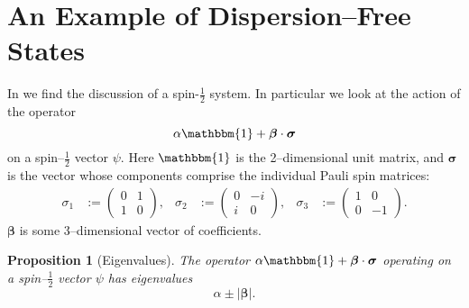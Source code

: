\documentclass[12pt]{article}
\newtheorem{prop}[thm]{Proposition}
\begin{document}
\section{An Example of Dispersion--Free States}

In \cite[p.448]{Bell1966} we find the discussion of a spin-$\frac{1}{2}$ system. In particular we look at the action of the operator
\begin{displaymath}
  \alpha \mathbbm{1} + \bm{\beta} \cdot \bm{\sigma}
\end{displaymath}
on a spin--$\frac{1}{2}$ vector $\psi$. Here $\mathbbm{1}$ is the 2--dimensional unit matrix, and $\bm{\sigma}$ is the vector whose components comprise the individual Pauli spin matrices:
\begin{align*}
  \sigma_1 &:= \begin{pmatrix}
                 0 & 1 \\
                 1 & 0
               \end{pmatrix},
              &
  \sigma_2 &:= \begin{pmatrix}
                 0 & -i \\
                 i & 0
               \end{pmatrix},
              &
  \sigma_3 &:= \begin{pmatrix}
                 1 & 0 \\
                 0 & -1
               \end{pmatrix}.
\end{align*}
$\bm{\beta}$ is some 3--dimensional vector of coefficients.

\begin{prop}[Eigenvalues]
  The operator $\alpha \mathbbm{1} + \bm{\beta} \cdot \bm{\sigma}$ operating on a spin--$\frac{1}{2}$ vector $\psi$ has eigenvalues
  \begin{displaymath}
    \alpha \pm |\bm{\beta}|.
  \end{displaymath}
\end{prop}
\end{document}
